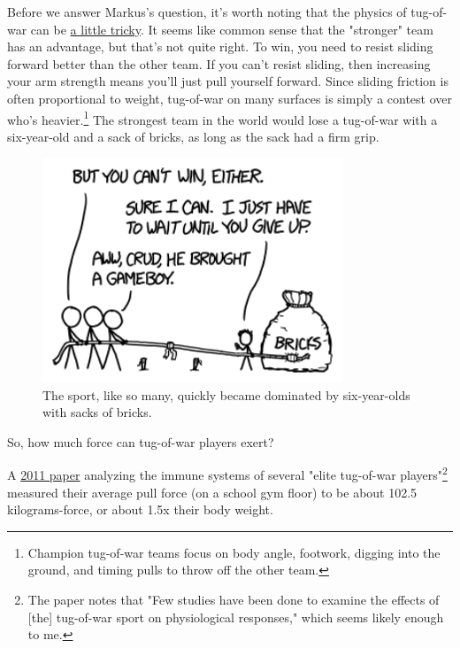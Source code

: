 {{Before we answer Markus's question, it's worth noting that the physics of tug-of-war can be \href{https://www.lhup.edu/\~dsimanek/scenario/insight.htm\#mechanics}{a little tricky}. It seems like common sense that the "stronger" team has an advantage, but that's not quite right. To win, you need to resist sliding forward better than the other team. If you can't resist sliding, then increasing your arm strength means you'll just pull yourself forward. Since sliding friction is often proportional to weight, tug-of-war on many surfaces is simply a contest over who's heavier.{\footnote{Champion tug-of-war teams focus on body angle, footwork, digging into the ground, and timing pulls to throw off the other team.} } The strongest team in the world would lose a tug-of-war with a six-year-old and a sack of bricks, as long as the sack had a firm grip.}

\begin{figure}[!htbp]
\centering
\includegraphics[scale=0.5, max width=0.8\textwidth]{imgs/a/127/bricks.png}
\caption{The sport, like so many, quickly became dominated by six-year-olds with sacks of bricks.}
\end{figure}

{So, how much force can tug-of-war players exert?}

{A \href{http://web.nchu.edu.tw/\~biosimulation/journal/pdf/vol-3-no01/vol-3-no-1-b-0003.pdf}{2011 paper} analyzing the immune systems of several "elite tug-of-war players"{\footnote{The paper notes that "Few studies have been done to examine the effects of [the] tug-of-war sport on physiological responses," which seems likely enough to me.} } measured their average pull force (on a school gym floor) to be about 102.5 kilograms-force, or about 1.5x their body weight.}

}
